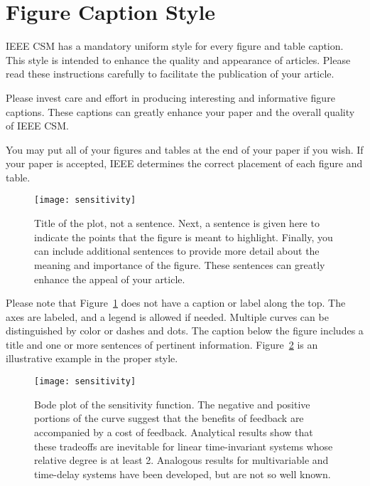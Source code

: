 \documentclass[letterpaper,12pt,peerreviewca,draftcls]{IEEEtran}
\begin{document}
\section{Figure Caption Style}


IEEE CSM has a mandatory uniform style for every figure and table
caption.  This style is intended to enhance the quality and
appearance of articles. Please read these instructions carefully
to facilitate the publication of your article.

Please invest care and effort in producing interesting and
informative figure captions.  These captions can greatly enhance
your paper and the overall quality of IEEE CSM.



You may put all of your figures and tables at the end of your
paper if you wish.  If your paper is accepted, IEEE determines the
correct placement of each figure and table.


\begin{figure}[t]
\centering
\texttt{[image: sensitivity]}
\caption{Title of the plot, not a sentence.  Next, a sentence is
given
  here to indicate the points that the figure is meant to
  highlight. Finally, you can include additional sentences to provide
  more detail about the meaning and importance of the figure.  These
  sentences can greatly enhance the appeal of your article.}
\label{fig1}
\end{figure}




Please note that Figure~\ref{fig1} does not have a caption or
label along the top.  The axes are labeled, and a legend is
allowed if needed. Multiple curves can be distinguished by color
or dashes and dots. The caption below the figure includes a title
and one or more sentences of pertinent information.
Figure~\ref{fig2} is an illustrative example in the proper style.



\begin{figure}[t]
\centering
\texttt{[image: sensitivity]}
\caption{Bode plot of the sensitivity function.  The negative and
  positive portions of the curve suggest that the benefits of feedback
  are accompanied by a cost of feedback.  Analytical results show that
  these tradeoffs are inevitable for linear time-invariant systems whose
  relative degree is at least 2.  Analogous results for multivariable
  and time-delay systems have been developed, but are not so well
  known.}
\label{fig2}
\end{figure}
\end{document}
